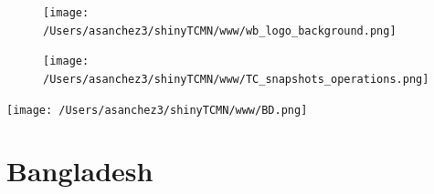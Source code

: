 \documentclass{article}\usepackage[]{graphicx}\usepackage[]{color}
\begin{document}
\newpage

\begin{figure}
  \vspace{-3ex} %
  \hspace{-7ex} %
  \texttt{[image: /Users/asanchez3/shinyTCMN/www/wb\_logo\_background.png]}
\end{figure}
\begin{figure}
  \begin{minipage}[t]{0.99\textwidth} %
      \vspace{-30ex}
      \hspace{-2ex}
      \raggedright{\texttt{[image: /Users/asanchez3/shinyTCMN/www/TC\_snapshots\_operations.png]}}
  \end{minipage}
\end{figure}
%
\begin{minipage}[t]{0.99\textwidth} %
  \vspace{-1.5cm}
  \begin{minipage}[c]{0.36\textwidth} 
    \begin{minipage}[c]{0.28\textwidth} %
      \texttt{[image: /Users/asanchez3/shinyTCMN/www/BD.png]}
    \end{minipage}
    \begin{minipage}[c]{0.70\textwidth} %
      \section*{\color{blue!40!black}Bangladesh}
    \end{minipage}
  \end{minipage}
  \begin{minipage}[c]{0.63\textwidth}
  \end{minipage}  
\end{minipage} %
\end{document}
